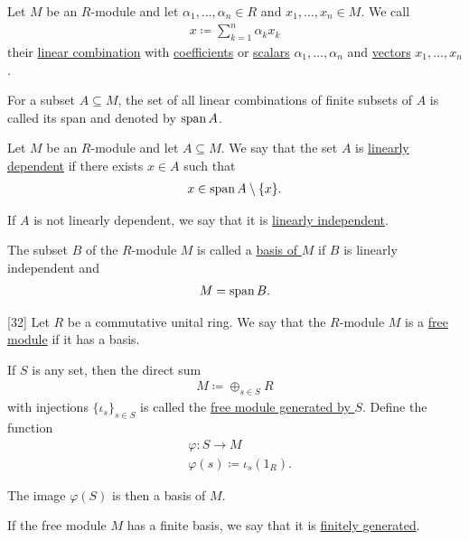 \begin{definition}\label{def:linear_combination}
  Let $M$ be an $R$-module and let $\alpha_1, \ldots, \alpha_n \in R$ and $x_1, \ldots, x_n \in M$. We call
  \begin{align*}
    x \coloneqq \sum_{k=1}^n \alpha_k x_k
  \end{align*}
  their \uline{linear combination} with \uline{coefficients} or \uline{scalars} $\alpha_1, \ldots, \alpha_n$ and \uline{vectors} $x_1, \ldots, x_n$.

  For a subset $A \subseteq M$, the set of all linear combinations of finite subsets of $A$ is called its span and denoted by $\operatorname{span}{A}$.
\end{definition}

\begin{definition}\label{def:linear_dependence}
  Let $M$ be an $R$-module and let $A \subseteq M$. We say that the set $A$ is \uline{linearly dependent} if there exists $x \in A$ such that
  \begin{align*}
    x \in \operatorname{span}{A} \setminus \{ x \}.
  \end{align*}

  If $A$ is not linearly dependent, we say that it is \uline{linearly independent}.
\end{definition}

\begin{definition}\label{def:module_basis}
  The subset $B$ of the $R$-module $M$ is called a \uline{basis of $M$} if $B$ is linearly independent and
  \begin{align*}
    M = \operatorname{span}{B}.
  \end{align*}
\end{definition}

\begin{definition}\label{def:free_module}[32]\cite{Kocev2016}
  Let $R$ be a commutative unital ring. We say that the $R$-module $M$ is a \uline{free module} if it has a basis.

  If $S$ is any set, then the direct sum
  \begin{align*}
    M \coloneqq \oplus_{s \in S} R
  \end{align*}
  with injections $\{ \iota_s \}_{s \in S}$ is called the \uline{free module generated by $S$}. Define the function
  \begin{align*}
    &\varphi: S \to M \\
    &\varphi(s) \coloneqq \iota_s(1_R).
  \end{align*}

  The image $\varphi(S)$ is then a basis of $M$.

  If the free module $M$ has a finite basis, we say that it is \uline{finitely generated}.
\end{definition}
